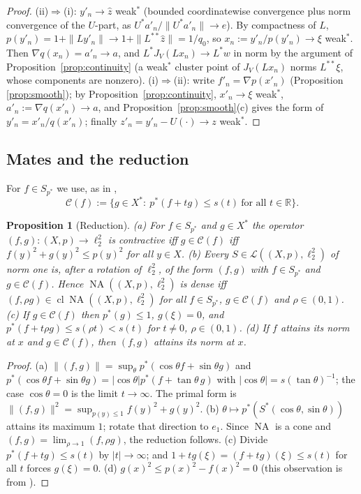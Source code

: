\documentclass[10pt]{amsart}
\newtheorem{proposition}[theorem]{Proposition}
\theoremstyle{definition}
\theoremstyle{remark}
\newcommand{\NA}{\operatorname{NA}}
\newcommand{\R}{\mathbb R}
\newcommand{\Cset}{\mathcal C}
\newcommand{\cl}{\operatorname{cl}}
\newcommand{\zh}{\hat z}
\begin{document}
\begin{proof}
(ii)$\Rightarrow$(i): $y'_n\to\zh$ weak$^*$ (bounded coordinatewise
convergence plus norm convergence of the $U$-part, as $U^*a'_n/\|U^*a'_n\|\to
e$).  By compactness of $L$, $p(y'_n)=1+\|Ly'_n\|\to1+\|L^{**}\zh\|=1/q_0$,
so $x_n:=y'_n/p(y'_n)\to\xi$ weak$^*$.  Then $\nabla q(x_n)=a'_n\to a$, and
$L^*J_V(Lx_n)\to L^*w$ in norm by the argument of
Proposition~\ref{prop:continuity} (a weak$^*$ cluster point of $J_V(Lx_n)$
norms $L^{**}\xi$, whose components are nonzero).
(i)$\Rightarrow$(ii): write $f'_n=\nabla p(x'_n)$ (Proposition
\ref{prop:smooth}); by Proposition~\ref{prop:continuity}, $x'_n\to\xi$
weak$^*$, $a'_n:=\nabla q(x'_n)\to a$, and Proposition~\ref{prop:smooth}(c)
gives the form of $y'_n=x'_n/q(x'_n)$; finally $z'_n=y'_n-U(\cdot)\to z$
weak$^*$.
\end{proof}

\subsection{Mates and the reduction}
For $f\in S_{p^*}$ we use, as in \cite{PrA},
\[
 \Cset(f):=\{g\in X^*:\ p^*(f+tg)\le s(t)\ \text{for all }t\in\R\}.
\]

\begin{proposition}[Reduction]\label{prop:reduction}
\textup{(a)} For $f\in S_{p^*}$ and $g\in X^*$ the operator
$(f,g):(X,p)\to\ell_2^2$ is contractive iff $g\in\Cset(f)$ iff
$f(y)^2+g(y)^2\le p(y)^2$ for all $y\in X$.
\textup{(b)} Every $S\in\mathcal L((X,p),\ell_2^2)$ of norm one is, after a
rotation of $\ell_2^2$, of the form $(f,g)$ with $f\in S_{p^*}$ and
$g\in\Cset(f)$.  Hence $\NA((X,p),\ell_2^2)$ is dense iff
$(f,\rho g)\in\cl\NA((X,p),\ell_2^2)$ for all $f\in S_{p^*}$,
$g\in\Cset(f)$ and $\rho\in(0,1)$.
\textup{(c)} If $g\in\Cset(f)$ then $p^*(g)\le1$, $g(\xi)=0$, and
$p^*(f+t\rho g)\le s(\rho t)<s(t)$ for $t\ne0$, $\rho\in(0,1)$.
\textup{(d)} If $f$ attains its norm at $x$ and $g\in\Cset(f)$, then
$(f,g)$ attains its norm at $x$.
\end{proposition}

\begin{proof}
(a) $\|(f,g)\|=\sup_\theta p^*(\cos\theta f+\sin\theta g)$ and
$p^*(\cos\theta f+\sin\theta g)=|\cos\theta|p^*(f+\tan\theta\,g)$ with
$|\cos\theta|=s(\tan\theta)^{-1}$; the case $\cos\theta=0$ is the limit
$t\to\infty$.  The primal form is
$\|(f,g)\|^2=\sup_{p(y)\le1}f(y)^2+g(y)^2$.
(b) $\theta\mapsto p^*(S^*(\cos\theta,\sin\theta))$ attains its maximum
$1$; rotate that direction to $e_1$.  Since $\NA$ is a cone and
$(f,g)=\lim_{\rho\to1}(f,\rho g)$, the reduction follows.
(c) Divide $p^*(f+tg)\le s(t)$ by $|t|\to\infty$; and
$1+tg(\xi)=(f+tg)(\xi)\le s(t)$ for all $t$ forces $g(\xi)=0$.
(d) $g(x)^2\le p(x)^2-f(x)^2=0$ (this observation is from
\cite[Section~13]{KLMW}).
\end{proof}
\end{document}
